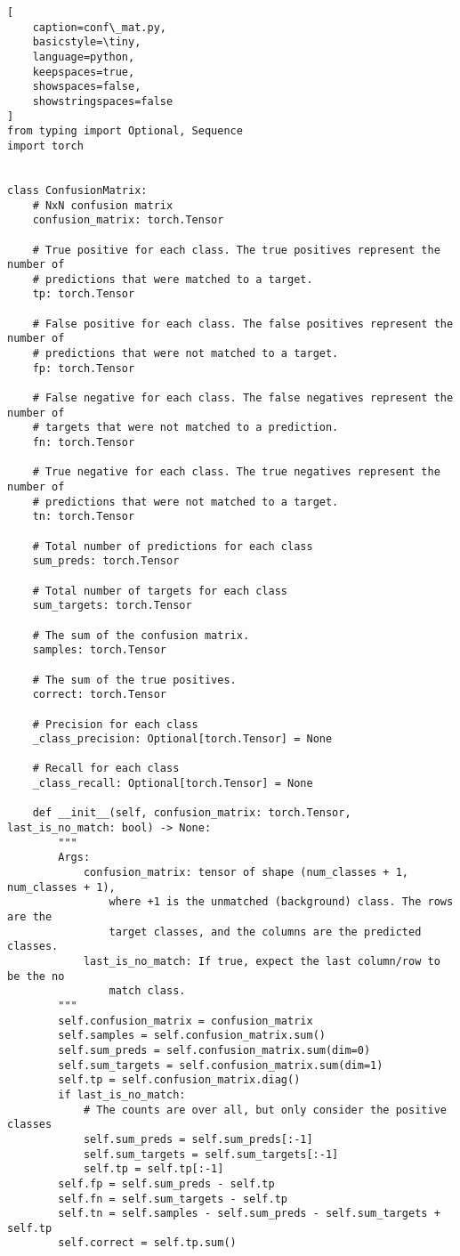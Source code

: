 \begin{lstlisting}[
    caption=conf\_mat.py,
    basicstyle=\tiny,
    language=python,
    keepspaces=true,
    showspaces=false,
    showstringspaces=false
]
from typing import Optional, Sequence
import torch


class ConfusionMatrix:
    # NxN confusion matrix
    confusion_matrix: torch.Tensor

    # True positive for each class. The true positives represent the number of
    # predictions that were matched to a target.
    tp: torch.Tensor

    # False positive for each class. The false positives represent the number of
    # predictions that were not matched to a target.
    fp: torch.Tensor

    # False negative for each class. The false negatives represent the number of
    # targets that were not matched to a prediction.
    fn: torch.Tensor

    # True negative for each class. The true negatives represent the number of
    # predictions that were not matched to a target.
    tn: torch.Tensor

    # Total number of predictions for each class
    sum_preds: torch.Tensor

    # Total number of targets for each class
    sum_targets: torch.Tensor

    # The sum of the confusion matrix.
    samples: torch.Tensor

    # The sum of the true positives.
    correct: torch.Tensor

    # Precision for each class
    _class_precision: Optional[torch.Tensor] = None

    # Recall for each class
    _class_recall: Optional[torch.Tensor] = None

    def __init__(self, confusion_matrix: torch.Tensor, last_is_no_match: bool) -> None:
        """
        Args:
            confusion_matrix: tensor of shape (num_classes + 1, num_classes + 1),
                where +1 is the unmatched (background) class. The rows are the
                target classes, and the columns are the predicted classes.
            last_is_no_match: If true, expect the last column/row to be the no
                match class.
        """
        self.confusion_matrix = confusion_matrix
        self.samples = self.confusion_matrix.sum()
        self.sum_preds = self.confusion_matrix.sum(dim=0)
        self.sum_targets = self.confusion_matrix.sum(dim=1)
        self.tp = self.confusion_matrix.diag()
        if last_is_no_match:
            # The counts are over all, but only consider the positive classes
            self.sum_preds = self.sum_preds[:-1]
            self.sum_targets = self.sum_targets[:-1]
            self.tp = self.tp[:-1]
        self.fp = self.sum_preds - self.tp
        self.fn = self.sum_targets - self.tp
        self.tn = self.samples - self.sum_preds - self.sum_targets + self.tp
        self.correct = self.tp.sum()


\end{lstlisting}
